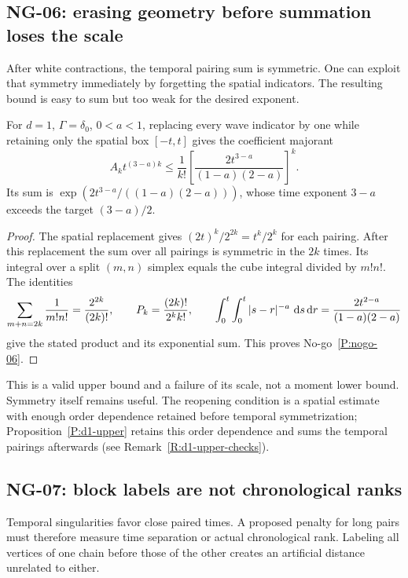 \subsection{NG-06: erasing geometry before summation loses the scale}
\label{S:nogo-06}

After white contractions, the temporal pairing sum is symmetric. One can
exploit that symmetry immediately by forgetting the spatial indicators.
The resulting bound is easy to sum but too weak for the desired exponent.

\setcounter{nogo}{5}
\begin{nogo}
  \label{P:nogo-06}
  For $d=1$, $\Gamma=\delta_0$, $0<a<1$, replacing every wave indicator by
  one while retaining only the spatial box $[-t,t]$ gives the coefficient
  majorant
  \[
    A_k t^{(3-a)k}\le
    \frac{1}{k!}\left[\frac{2t^{3-a}}{(1-a)(2-a)}\right]^k.
  \]
  Its sum is $\exp(2t^{3-a}/((1-a)(2-a)))$, whose time exponent
  $3-a$ exceeds the target $(3-a)/2$.
\end{nogo}
\begin{proof}
  The spatial replacement gives $(2t)^k/2^{2k}=t^k/2^k$ for each pairing.
  After this replacement the sum over all pairings is symmetric in the
  $2k$ times. Its integral over a split $(m,n)$ simplex equals the cube
  integral divided by $m!n!$. The identities
  \[
    \sum_{m+n=2k}\frac1{m!n!}=\frac{2^{2k}}{(2k)!},\qquad
    P_k=\frac{(2k)!}{2^k k!},\qquad
    \int_0^t\int_0^t|s-r|^{-a}\,\,\mathrm{d} s\,\mathrm{d} r
    =\frac{2t^{2-a}}{(1-a)(2-a)}
  \]
  give the stated product and its exponential sum.
  This proves No-go~\ref{P:nogo-06}.
\end{proof}

This is a valid upper bound and a failure of its scale, not a moment lower
bound. Symmetry itself remains useful. The reopening condition is a spatial
estimate with enough order dependence retained before temporal
symmetrization; Proposition~\ref{P:d1-upper} retains this order dependence
and sums the temporal pairings afterwards (see
Remark~\ref{R:d1-upper-checks}).

\subsection{NG-07: block labels are not chronological ranks}
\label{S:nogo-07}

Temporal singularities favor close paired times. A proposed penalty for
long pairs must therefore measure time separation or actual chronological
rank. Labeling all vertices of one chain before those of the other creates
an artificial distance unrelated to either.

